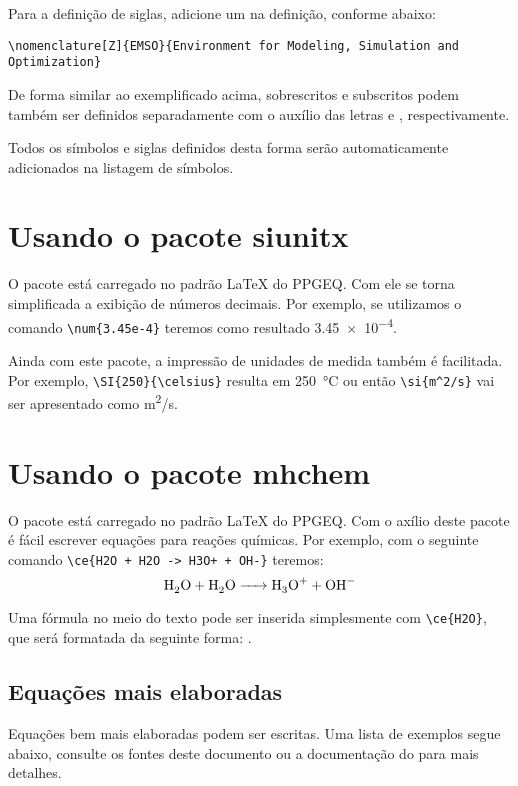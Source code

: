 Para a definição de siglas, adicione um  na definição,
conforme abaixo:
\begin{lstlisting}[numbers=none]
\nomenclature[Z]{EMSO}{Environment for Modeling, Simulation and Optimization}
\end{lstlisting}

De forma similar ao exemplificado acima, sobrescritos e subscritos podem
também ser definidos separadamente com o auxílio das letras  e , respectivamente.

Todos os símbolos e siglas definidos desta forma serão automaticamente adicionados
na listagem de símbolos.

\section{Usando o pacote siunitx}

O pacote  está carregado no padrão \LaTeX{} do PPGEQ.
Com ele se torna simplificada a exibição de números decimais.
Por exemplo, se utilizamos o comando \verb|\num{3.45e-4}| teremos como resultado \num{3.45e-4}.

Ainda com este pacote, a impressão de unidades de medida também é facilitada.
Por exemplo, \verb|\SI{250}{\celsius}| resulta em \SI{250}{\celsius} ou então
\verb|\si{m^2/s}| vai ser apresentado como \si{m^2/s}.

\section{Usando o pacote mhchem}

O pacote  está carregado no padrão \LaTeX{} do PPGEQ.
Com o axílio deste pacote é fácil escrever equações para reações químicas.
Por exemplo, com o seguinte comando \verb|\ce{H2O + H2O -> H3O+ + OH-}| teremos:
\begin{equation}
\ce{H2O + H2O -> H3O+ + OH-}
\end{equation}

Uma fórmula no meio do texto pode ser inserida simplesmente
com \verb|\ce{H2O}|, que será formatada da seguinte forma: .

\subsection{Equações mais elaboradas}

Equações bem mais elaboradas podem ser escritas.
Uma lista de exemplos segue abaixo, consulte os fontes deste documento ou
a documentação do  para mais detalhes.

